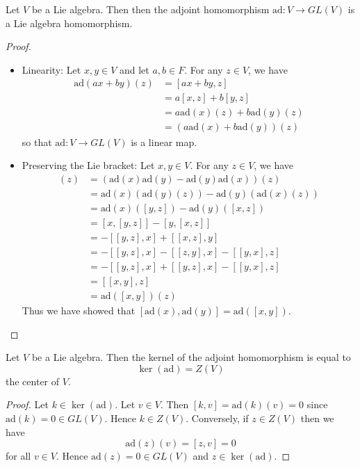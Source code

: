 \documentclass[a4paper]{article}
\begin{document}
\begin{lmm}{}{} Let $V$ be a Lie algebra. Then then the adjoint homomorphism $\text{ad}:V\to GL(V)$ is a Lie algebra homomorphism. \tcbline
\begin{proof}~\\
\begin{itemize}
\item Linearity: Let $x,y\in V$ and let $a,b\in F$. For any $z\in V$, we have
\begin{align*}
\text{ad}(ax+by)(z)&=[ax+by,z]\\
&=a[x,z]+b[y,z]\\
&=a\text{ad}(x)(z)+b\text{ad}(y)(z)\\
&=\left(a\text{ad}(x)+b\text{ad}(y)\right)(z)
\end{align*}
so that $\text{ad}:V\to GL(V)$ is a linear map. 
\item Preserving the Lie bracket: Let $x,y\in V$. For any $z\in V$, we have
\begin{align*}
[\text{ad}(x),\text{ad}(y)](z)&=\left(\text{ad}(x)\text{ad}(y)-\text{ad}(y)\text{ad}(x)\right)(z)\\
&=\text{ad}(x)\left(\text{ad}(y)(z)\right)-\text{ad}(y)\left(\text{ad}(x)(z)\right)\\
&=\text{ad}(x)([y,z])-\text{ad}(y)([x,z])\\
&=[x,[y,z]]-[y,[x,z]]\\
&=-[[y,z],x]+[[x,z],y]\\
&=-[[y,z],x]-[[z,y],x]-[[y,x],z]\\
&=-[[y,z],x]+[[y,z],x]-[[y,x],z]\\
&=[[x,y],z]\\
&=\text{ad}([x,y])(z)
\end{align*}
Thus we have showed that $[\text{ad}(x),\text{ad}(y)]=\text{ad}([x,y])$. 
\end{itemize}
\end{proof}
\end{lmm}

\begin{lmm}{}{} Let $V$ be a Lie algebra. Then the kernel of the adjoint homomorphism is equal to $$\ker(\text{ad})=Z(V)$$ the center of $V$. \tcbline
\begin{proof}
Let $k\in\ker(\text{ad})$. Let $v\in V$. Then $[k,v]=\text{ad}(k)(v)=0$ since $\text{ad}(k)=0\in GL(V)$. Hence $k\in Z(V)$. Conversely, if $z\in Z(V)$ then we have $$\text{ad}(z)(v)=[z,v]=0$$ for all $v\in V$. Hence $\text{ad}(z)=0\in GL(V)$ and $z\in\ker(\text{ad})$. 
\end{proof}
\end{lmm}
\end{document}
